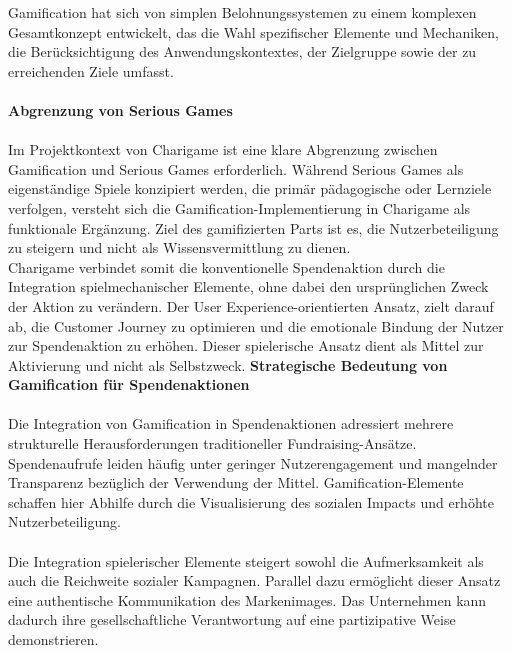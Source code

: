 Gamification hat sich von simplen Belohnungssystemen zu einem komplexen Gesamtkonzept entwickelt, das die Wahl spezifischer Elemente und Mechaniken, die Berücksichtigung des Anwendungskontextes, der Zielgruppe sowie der zu erreichenden Ziele umfasst.\cite{bpb2023gamification}
\\\\
\textbf{Abgrenzung von Serious Games}\\\\
Im Projektkontext von Charigame ist eine klare Abgrenzung zwischen Gamification und Serious Games erforderlich.
Während Serious Games als eigenständige Spiele konzipiert werden, die primär pädagogische oder Lernziele verfolgen, versteht sich die Gamification-Implementierung in Charigame als funktionale Ergänzung.
Ziel des gamifizierten Parts ist es, die Nutzerbeteiligung zu steigern und nicht als Wissensvermittlung zu dienen.
\\
Charigame verbindet somit die konventionelle Spendenaktion durch die Integration spielmechanischer Elemente, ohne dabei den ursprünglichen Zweck der Aktion zu verändern.
Der User Experience-orientierten Ansatz, zielt darauf ab, die Customer Journey zu optimieren und die emotionale Bindung der Nutzer zur Spendenaktion zu erhöhen.
Dieser spielerische Ansatz dient als Mittel zur Aktivierung und nicht als Selbstzweck.
\newpage
\textbf{Strategische Bedeutung von Gamification für Spendenaktionen}
\\\\
Die Integration von Gamification in Spendenaktionen adressiert mehrere strukturelle Herausforderungen traditioneller Fundraising-Ansätze.
Spendenaufrufe leiden häufig unter geringer Nutzerengagement und mangelnder Transparenz bezüglich der Verwendung der Mittel.
Gamification-Elemente schaffen hier Abhilfe durch die Visualisierung des sozialen Impacts und erhöhte Nutzerbeteiligung\cite{golrang2021applying}.
\\\\
Die Integration spielerischer Elemente steigert sowohl die Aufmerksamkeit als auch die Reichweite sozialer Kampagnen.
Parallel dazu ermöglicht dieser Ansatz eine authentische Kommunikation des Markenimages.
Das Unternehmen kann dadurch ihre gesellschaftliche Verantwortung auf eine partizipative Weise demonstrieren.

